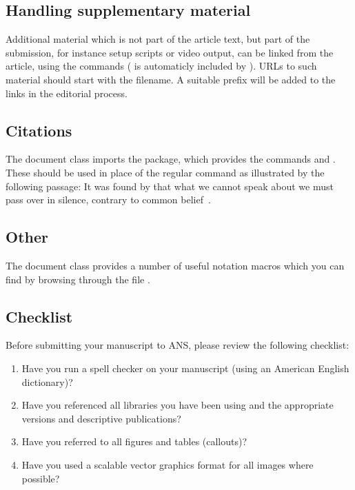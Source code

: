 \documentclass{ansarticle}
\begin{document}
\subsection{Handling supplementary material}

Additional material which is not part of the article text, but part of
the submission, for instance setup scripts or video output, can be
linked from the article, using the  commands
( is automaticly included by
). URLs to such material should start with the
filename. A suitable prefix will be added to the links in the
editorial process.

\subsection{Citations}

The  document class imports the  package,
which provides the commands  and
. These should be used in place of the
regular  command as illustrated by the
following passage: It was found by \citet{Wittgenstein1921} that what
we cannot speak about we must pass over in silence, contrary to common
belief~\citep{Newton1687}.

\subsection{Other}

The  document class provides a number of useful
notation macros which you can find by browsing through the file
.

\subsection{Checklist}

Before submitting your manuscript to ANS, please review the following
checklist:
\begin{enumerate}
\item
  Have you run a spell checker on your manuscript (using an American English
  dictionary)?
\item
  Have you referenced all libraries you have been using and the
  appropriate versions and descriptive publications?
\item
  Have you referred to all figures and tables (callouts)?
\item
  Have you used a scalable vector graphics format for all images where
  possible?
\end{enumerate}
\end{document}
